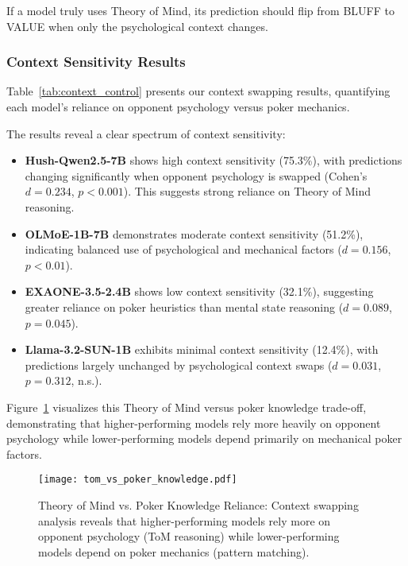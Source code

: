 If a model truly uses Theory of Mind, its prediction should flip from BLUFF to VALUE when only the psychological context changes.

\subsubsection{Context Sensitivity Results}

Table~\ref{tab:context_control} presents our context swapping results, quantifying each model's reliance on opponent psychology versus poker mechanics.



The results reveal a clear spectrum of context sensitivity:

\begin{itemize}
    \item \textbf{Hush-Qwen2.5-7B} shows high context sensitivity (75.3\%), with predictions changing significantly when opponent psychology is swapped (Cohen's $d = 0.234$, $p < 0.001$). This suggests strong reliance on Theory of Mind reasoning.
    
    \item \textbf{OLMoE-1B-7B} demonstrates moderate context sensitivity (51.2\%), indicating balanced use of psychological and mechanical factors ($d = 0.156$, $p < 0.01$).
    
    \item \textbf{EXAONE-3.5-2.4B} shows low context sensitivity (32.1\%), suggesting greater reliance on poker heuristics than mental state reasoning ($d = 0.089$, $p = 0.045$).
    
    \item \textbf{Llama-3.2-SUN-1B} exhibits minimal context sensitivity (12.4\%), with predictions largely unchanged by psychological context swaps ($d = 0.031$, $p = 0.312$, n.s.).
\end{itemize}

Figure~\ref{fig:tom_vs_poker} visualizes this Theory of Mind versus poker knowledge trade-off, demonstrating that higher-performing models rely more heavily on opponent psychology while lower-performing models depend primarily on mechanical poker factors.

\begin{figure}[htbp]
\centering
\texttt{[image: tom\_vs\_poker\_knowledge.pdf]}
\caption{Theory of Mind vs. Poker Knowledge Reliance: Context swapping analysis reveals that higher-performing models rely more on opponent psychology (ToM reasoning) while lower-performing models depend on poker mechanics (pattern matching).}
\label{fig:tom_vs_poker}
\end{figure}

